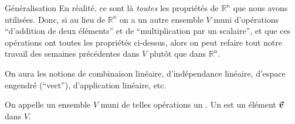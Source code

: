\documentclass[a4paper]{article}
\begin{document}
\begin{parag}{Généralisation}
    En réalité, ce sont là \textit{toutes} les propriétés de $\mathbb{R}^{n}$ que nous avons utilisées. Donc, si au lieu de $\mathbb{R}^{n}$ on a un autre ensemble $V$ muni d'opérations ``d'addition de deux éléments'' et de ``multiplication par un scalaire'', et que ces opérations ont toutes les propriétés ci-dessus, alors on peut refaire tout notre travail des semaines précédentes dans $V$ plutôt que dans $\mathbb{R}^{n}$.

    On aura les notions de combinaison linéaire, d'indépendance linéaire, d'espace engendré (``vect''), d'application linéaire, etc.

    On appelle un ensemble $V$ muni de telles opérations un . Un  est un élément $\bm{\protect\vec{v}}$ dans $V$.
\end{parag}
\end{document}
